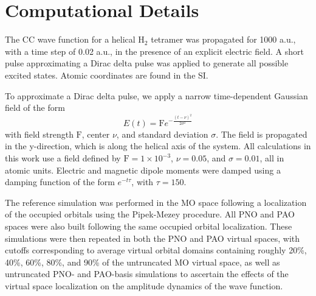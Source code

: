 \section{Computational Details} \label{se:comp}
The CC wave function for a helical H$_2$ tetramer was propagated
for 1000 a.u., with a time step of 0.02 a.u., in the presence of an explicit electric field. A short pulse
approximating a Dirac delta pulse was applied to generate all possible excited states. Atomic coordinates
are found in the SI.

To approximate a Dirac delta pulse, we apply a narrow time-dependent Gaussian field 
of the form
\begin{equation}
    E(t) = \textrm{F}e^{-\frac{(t-\nu)^{2}}{2\sigma^2}}
\end{equation}
with field strength $\textrm{F}$, center $\nu$, and standard deviation $\sigma$.
The field is propagated in the y-direction, which is along the helical axis of the system.
All calculations in this work use a field defined by $\textrm{F} = 1\times 10^{-3}$,
$\nu = 0.05$, and $\sigma = 0.01$, all in atomic units. Electric and magnetic 
dipole moments were damped using a damping function of the form $e^{-t\tau}$, 
with $\tau = 150$.

The reference simulation was performed in the MO space following a localization of the occupied
orbitals using the Pipek-Mezey procedure.\cite{Pipek1989} All PNO and PAO spaces were also 
built following the same occupied orbital localization. These simulations
were then repeated in both the PNO and PAO virtual spaces, with cutoffs
corresponding to average virtual orbital domains containing roughly 20\%, 40\%, 60\%,
80\%, and 90\% of the untruncated MO virtual space, as well as untruncated PNO- and PAO-basis
simulations to ascertain the effects of the virtual space localization on
the amplitude dynamics of the wave function. 

